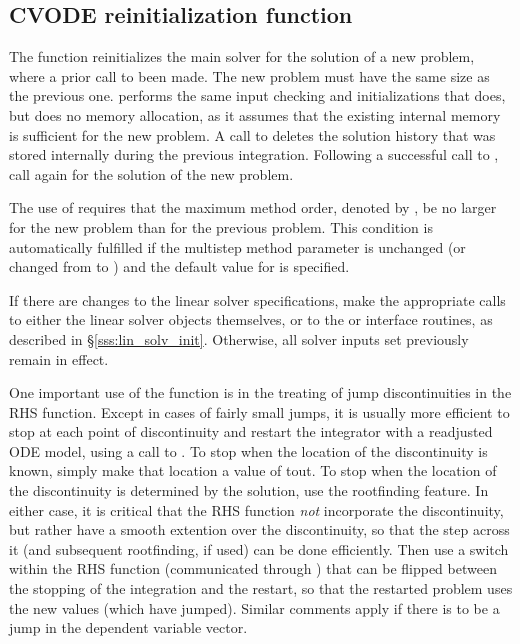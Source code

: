 \subsection{CVODE reinitialization function}\label{sss:cvreinit}

The function  reinitializes the main {\cvode} solver for
the solution of a new problem, where a prior call to 
been made. The new problem must have the same size as the previous one.
 performs the same input checking and initializations
that  does, but does no memory allocation, as it assumes that the
existing internal memory is sufficient for the new problem.
A call to  deletes the solution history that was stored
internally during the previous integration.  Following a successful call to
, call  again for the solution of the new problem.

The use of  requires that the maximum method order, denoted by
, be no larger for the new problem than for the previous problem.
This condition is
automatically fulfilled if the multistep method parameter 
is unchanged (or changed from  to ) and the default
value for  is specified.

If there are changes to the linear solver specifications, make the
appropriate calls to either the linear solver objects themselves, or
to the {\cvdls} or {\cvspils} interface routines, as described in
\S\ref{sss:lin_solv_init}.  Otherwise, all solver inputs set
previously remain in effect.

One important use of the  function is in the treating
of jump discontinuities in the RHS function.  Except in cases of
fairly small jumps, it is usually more efficient to stop at each point
of discontinuity and restart the integrator with a readjusted ODE
model, using a call to .  To stop when the location of
the discontinuity is known, simply make that location a value of tout.
To stop when the location of the discontinuity is determined by the
solution, use the rootfinding feature.  In either case, it is critical
that the RHS function {\it not} incorporate the discontinuity, but
rather have a smooth extention over the discontinuity, so that the
step across it (and subsequent rootfinding, if used) can be done
efficiently.  Then use a switch within the RHS function (communicated
through ) that can be flipped between the stopping of
the integration and the restart, so that the restarted problem uses
the new values (which have jumped).  Similar comments apply if there
is to be a jump in the dependent variable vector.


